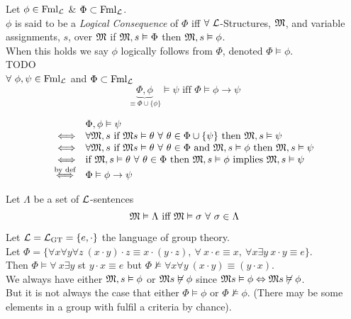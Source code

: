 \documentclass[11pt,a4paper]{article}
\begin{document}
Let $\phi\in\text{Fml}_{\mathcal{L}}$ \& $\Phi\subset\text{Fml}_{\mathcal{L}}$.\\
$\phi$ is said to be a \textit{Logical Consequence} of $\Phi$ iff $\forall\ \mathcal{L}$-Structures, $\mathfrak{M}$, and variable assignments, $s$, over $\mathfrak{M}$ if $\mathfrak{M},s\vDash\Phi$ then $\mathfrak{M},s\vDash\phi$.\\
\nb When this holds we say $\phi$ logically follows from $\Phi$, denoted $\Phi\vDash\phi$.\\

TODO\\

\proposition{}
$\forall\ \phi,\psi\in\text{Fml}_{\mathcal{L}}$ and $\Phi\subset\text{Fml}_{\mathcal{L}}$
$$\underbrace{\Phi,\phi}_{\equiv\Phi\cup\{\phi\}}\vDash\psi\text{ iff }\Phi\vDash\phi\to\psi$$

\[\begin{array}{rl}
&\Phi,\phi\vDash\psi\\
\Longleftrightarrow&\forall\M,s\text{ if }\M s\vDash\theta\ \forall\ \theta\in\Phi\cup\{\psi\}\text{ then }\M,s\vDash\psi\\
\Longleftrightarrow&\forall\M,s\text{ if }\M s\vDash\theta\ \forall\ \theta\in\Phi\text{ and }\M,s\vDash\phi\text{ then }\M,s\vDash\psi\\
\Longleftrightarrow&\text{if }\M,s\vDash\theta\ \forall\ \theta\in\Phi\text{ then }\M,s\vDash\phi\text{ implies }\M,s\vDash\psi\\
\overset{\text{by def}}{\Longleftrightarrow}&\Phi\vDash\phi\to\psi
\end{array}\]

Let $\Lambda$ be a set of $\mathcal{L}$-sentences
$$\M\vDash\Lambda\text{ iff }\M\vDash\sigma\ \forall\ \sigma\in\Lambda$$

\example{}
Let $\mathcal{L}=\mathcal{L}_\text{GT}=\{e,\cdot\}$ the language of group theory.\\
Let $\Phi=\{\forall x\forall y\forall z\ (x\cdot y)\cdot z\equiv x\cdot(y\cdot z),\ \forall\ x\cdot e\equiv x,\ \forall x\exists y\ x\cdot y\equiv e\}$.\\
Then $\Phi\vDash\forall\ x\exists y$ st $y\cdot x\equiv e$ but $\Phi\not\vDash\forall x\forall y\ (x\cdot y)\equiv(y\cdot x)$.\\

\remark{}
We always have either $\mathfrak{M},s\vDash\phi$ or $\mathfrak{M} s\not\vDash\phi$ since $\mathfrak{M} s\vDash\phi\Leftrightarrow\mathfrak{M} s\not\vDash\phi$.\\
But it is not always the case that either $\Phi\vDash\phi$ or $\Phi\not\vDash\phi$. (There may be some elements in a group with fulfil a criteria by chance).\\
\end{document}
